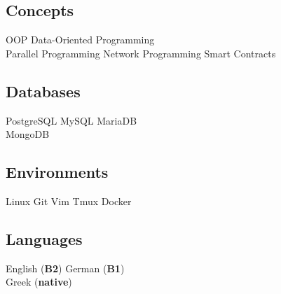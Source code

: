 \documentclass[]{deedy-resume-openfont}
\begin{document}
\begin{minipage}[t]{0.33\textwidth}
\subsection{Concepts}
OOP \textbullet{}
Data-Oriented Programming \\
Parallel Programming \textbullet{}
Network Programming \textbullet{}
Smart Contracts \\
\sectionsep

\subsection{Databases}
PostgreSQL \textbullet{}
MySQL \textbullet{}
MariaDB \\
MongoDB \\
\sectionsep

\subsection{Environments}
Linux \textbullet{}
Git \textbullet{}
Vim \textbullet{}
Tmux \textbullet{}
Docker \\
\sectionsep

\subsection{Languages}
English (\textbf{B2}) \textbullet{}
German (\textbf{B1}) \\
Greek (\textbf{native})

%
%

\end{minipage}
\hfill
\end{document}
